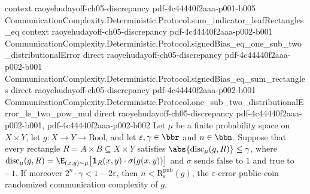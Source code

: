 \begin{theorem}
  {context}
  {raoyehudayoff-ch05-discrepancy}
  {pdf-4c44440f2aaa-p001-b005}
\proofstep
  {CommunicationComplexity.Deterministic.Protocol.sum_indicator_leafRectangles_eq}
  {context}
  {raoyehudayoff-ch05-discrepancy}
  {pdf-4c44440f2aaa-p002-b001}
\proofstep
  {CommunicationComplexity.Deterministic.Protocol.signedBias_eq_one_sub_two_distributionalError}
  {direct}
  {raoyehudayoff-ch05-discrepancy}
  {pdf-4c44440f2aaa-p002-b001}
\proofstep
  {CommunicationComplexity.Deterministic.Protocol.signedBias_eq_sum_rectangles}
  {direct}
  {raoyehudayoff-ch05-discrepancy}
  {pdf-4c44440f2aaa-p002-b001}
\proofstep
  {CommunicationComplexity.Deterministic.Protocol.one_sub_two_distributionalError_le_two_pow_mul}
  {direct}
  {raoyehudayoff-ch05-discrepancy}
  {pdf-4c44440f2aaa-p002-b001,
    pdf-4c44440f2aaa-p002-b002}
Let $\mu$ be a finite probability space on $X \times Y$, let $g : X \to Y \to
\mathrm{Bool}$, and let $\varepsilon, \gamma \in \bbr$ and $n \in \bbn$. Suppose that
every rectangle $R = A \times B \subseteq X \times Y$ satisfies
$\abs{\mathrm{disc}_\mu(g, R)} \le \gamma$, where $\mathrm{disc}_\mu(g, R) =
\E_{(x,y)\sim\mu}\bigl[\mathbf{1}_R(x,y)\cdot\sigma(g(x,y))\bigr]$ and $\sigma$ sends
$\mathrm{false}$ to $1$ and $\mathrm{true}$ to $-1$. If moreover $2^n \cdot \gamma < 1 -
2\varepsilon$, then $n < \mathrm{R}^{\mathrm{pub}}_\varepsilon(g)$, the
$\varepsilon$-error public-coin randomized communication complexity of $g$.
\end{theorem}
